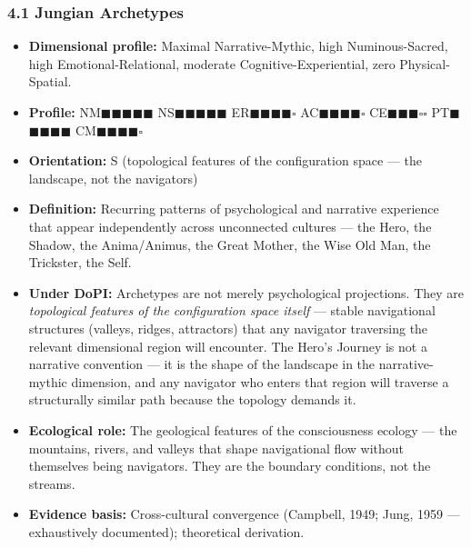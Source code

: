 \subsubsection*{4.1 Jungian Archetypes}

\begin{itemize}[nosep,leftmargin=*]
  \item \textbf{Dimensional profile:} Maximal Narrative-Mythic, high Numinous-Sacred, high Emotional-Relational, moderate Cognitive-Experiential, zero Physical-Spatial.
  \item \textbf{Profile:} NM$\blacksquare$$\blacksquare$$\blacksquare$$\blacksquare$$\blacksquare$ NS$\blacksquare$$\blacksquare$$\blacksquare$$\blacksquare$$\blacksquare$ ER$\blacksquare$$\blacksquare$$\blacksquare$$\blacksquare$$\square$ AC$\blacksquare$$\blacksquare$$\blacksquare$$\blacksquare$$\square$ CE$\blacksquare$$\blacksquare$$\blacksquare$$\square$$\square$ PT$\blacksquare$$\blacksquare$$\blacksquare$$\blacksquare$$\blacksquare$ CM$\blacksquare$$\blacksquare$$\blacksquare$$\blacksquare$$\square$
  \item \textbf{Orientation:} S (topological features of the configuration space — the landscape, not the navigators)
  \item \textbf{Definition:} Recurring patterns of psychological and narrative experience that appear independently across unconnected cultures — the Hero, the Shadow, the Anima/Animus, the Great Mother, the Wise Old Man, the Trickster, the Self.
  \item \textbf{Under DoPI:} Archetypes are not merely psychological projections. They are \textit{topological features of the configuration space itself} — stable navigational structures (valleys, ridges, attractors) that any navigator traversing the relevant dimensional region will encounter. The Hero's Journey is not a narrative convention — it is the shape of the landscape in the narrative-mythic dimension, and any navigator who enters that region will traverse a structurally similar path because the topology demands it.
  \item \textbf{Ecological role:} The geological features of the consciousness ecology — the mountains, rivers, and valleys that shape navigational flow without themselves being navigators. They are the boundary conditions, not the streams.
  \item \textbf{Evidence basis:} Cross-cultural convergence (Campbell, 1949; Jung, 1959 — exhaustively documented); theoretical derivation.
\end{itemize}


